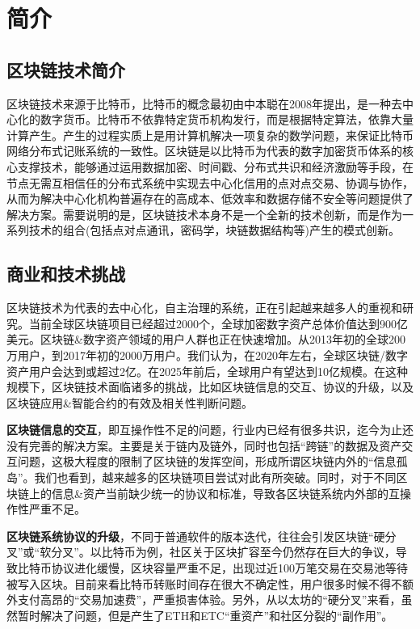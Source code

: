 \section{简介}

\subsection{区块链技术简介}
区块链技术来源于比特币\cite{Nakamoto2008}，比特币的概念最初由中本聪在2008年提出，是一种去中心化的数字货币。比特币不依靠特定货币机构发行，而是根据特定算法，依靠大量计算产生。产生的过程实质上是用计算机解决一项复杂的数学问题，来保证比特币网络分布式记账系统的一致性。区块链是以比特币为代表的数字加密货币体系的核心支撑技术，能够通过运用数据加密、时间戳、分布式共识和经济激励等手段，在节点无需互相信任的分布式系统中实现去中心化信用的点对点交易、协调与协作，从而为解决中心化机构普遍存在的高成本、低效率和数据存储不安全等问题提供了解决方案。需要说明的是，区块链技术本身不是一个全新的技术创新，而是作为一系列技术的组合(包括点对点通讯，密码学，块链数据结构等)产生的模式创新。

\subsection{商业和技术挑战}
区块链技术为代表的去中心化，自主治理的系统，正在引起越来越多人的重视和研究。当前全球区块链项目已经超过2000个，全球加密数字资产总体价值达到900亿美元。区块链\&数字资产领域的用户人群也正在快速增加。从2013年初的全球200万用户，到2017年初的2000万用户。我们认为，在2020年左右，全球区块链/数字资产用户会达到或超过2亿。在2025年前后，全球用户有望达到10亿规模。在这种规模下，区块链技术面临诸多的挑战，比如区块链信息的交互、协议的升级，以及区块链应用\&智能合约的有效及相关性判断问题。

\textbf{区块链信息的交互}，即互操作性不足的问题，行业内已经有很多共识，迄今为止还没有完善的解决方案。主要是关于链内及链外，同时也包括“跨链”的数据及资产交互问题，这极大程度的限制了区块链的发挥空间，形成所谓区块链内外的“信息孤岛”。我们也看到，越来越多的区块链项目尝试对此有所突破。同时，对于不同区块链上的信息\&资产当前缺少统一的协议和标准，导致各区块链系统内外部的互操作性严重不足。

\textbf{区块链系统协议的升级}，不同于普通软件的版本迭代，往往会引发区块链“硬分叉”或“软分叉”。以比特币为例，社区关于区块扩容至今仍然存在巨大的争议，导致比特币协议进化缓慢，区块容量严重不足，出现过近100万笔交易在交易池等待被写入区块。目前来看比特币转账时间存在很大不确定性，用户很多时候不得不额外支付高昂的“交易加速费”，严重损害体验。另外，从以太坊的“硬分叉”来看，虽然暂时解决了问题，但是产生了ETH和ETC“重资产”和社区分裂的“副作用”。

